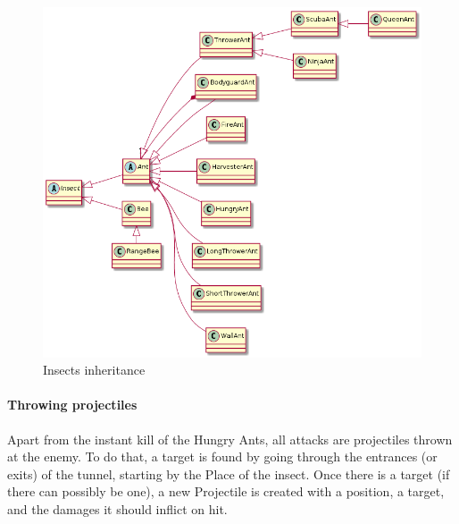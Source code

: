 \documentclass[
	a4paper
]{article}
\begin{document}
\begin{figure}[H]
	\includegraphics[scale=0.65]{insectsDiagram.png}
	\caption{Insects inheritance}
	\label{insectsDiagram}
\end{figure}

\paragraph{Throwing projectiles} Apart from the instant kill of the Hungry Ants, all attacks are projectiles thrown at the enemy. %
To do that, a target is found by going through the entrances (or exits) of the tunnel, starting by the Place of the insect. %
Once there is a target (if there can possibly be one), a new Projectile is created with a position, a target, and the damages it should inflict on hit.
\end{document}

